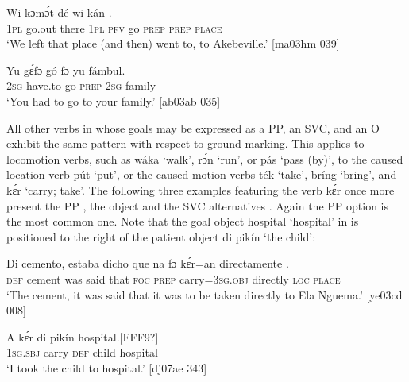 \ea%
    \label{ex:key:955}
    \gll Wi  kɔmɔ́t  dé    wi  kán        .\\
\textsc{1pl}  go.out  there  \textsc{1pl}  \textsc{pfv}  go  \textsc{prep}  \textsc{prep}  \textsc{place}\\

\glt ‘We left that place (and then) went to, to Akebeville.’ [ma03hm 039]
\z


\ea%
    \label{ex:key:956}
    \gll Yu  gɛ́fɔ    gó  fɔ  yu  fámbul.\\
\textsc{2sg}  have.to  go  \textsc{prep}  \textsc{2sg}  family\\

\glt ‘You had to go to your family.’ [ab03ab 035]
\z

All other verbs in  whose goals may be expressed as a PP, an SVC, and an O exhibit the same pattern with respect to ground marking. This applies to locomotion verbs, such as wáka ‘walk’, rɔ́n ‘run’, or pás ‘pass (by)’, to the caused location verb pút ‘put’, or the caused motion verbs ték ‘take’, bríng ‘bring’, and kɛ́r ‘carry; take’. The following three examples featuring the verb kɛ́r once more present the PP , the object  and the SVC alternatives . Again the PP option is the most common one. Note that the goal object hospital ‘hospital’ in  is positioned to the right of the patient object di pikín ‘the child’: 


\ea%
    \label{ex:key:957}
    \gll Di  cemento,  estaba  dicho  que    na  fɔ  kɛ́r=an
directamente    { }.\\
\textsc{def}  cement    was    said    that    \textsc{foc}  \textsc{prep}  carry=\textsc{3sg.obj} 
directly    \textsc{loc}  \textsc{place}\\

\glt ‘The cement, it was said that it was to be taken directly to Ela Nguema.’ [ye03cd 008]
\z


\ea%
    \label{ex:key:958}
    \gll A    kɛ́r    di  pikín  hospital.[FFF9?]\\
\textsc{1sg.sbj}  carry  \textsc{def}  child  hospital\\

\glt ‘I took the child to hospital.’ [dj07ae 343]
\z


